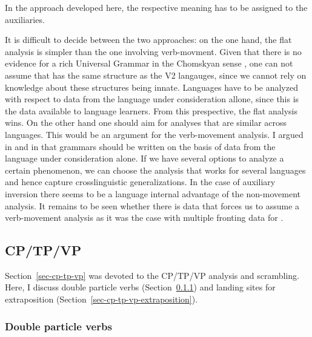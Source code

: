 \noindent
In the approach developed here, the respective meaning has to be assigned to the auxiliaries.

It is difficult to decide between the two approaches: on the one hand, the flat analysis is simpler
than the one involving verb-movment. Given that there is no evidence for a rich Universal Grammar in
the Chomskyan sense \citep{HCF2002a}, one can not assume that  has the same structure as the
 V2 langauges, since we cannot rely on knowledge about these structures being
innate. Languages have to be analyzed with respect to data from the language under consideration
allone, since this is the data available to language learners. From this prespective, the flat
analysis wins. On the other hand one should aim for analyses that are similar across languages. This
would be an argument for the verb-movement analysis. I argued in  and in
 that grammars should be written on the basis of data from the language under
consideration alone. If we have several options to analyze a certain phenomenon, we can choose the
analysis that works for several languages and hence capture crosslinguistic generalizations. In the
case of  auxiliary inversion there seems to be a language internal advantage of the
non-movement analysis. It remains to be seen whether there is data that forces us to assume a verb-movement
analysis as it was the case with multiple fronting data for  \citep{Mueller2005d,MuellerGS}.





\subsection{CP/TP/VP}
\label{sec-cp-tp-vp-and-verb-last-non-movement}

Section~\ref{sec-cp-tp-vp} was devoted to the CP/TP/VP analysis and
scrambling. Here, I discuss double particle verbs (Section~\ref{sec-cp-tp-vp-double-particles}) and landing sites for extraposition (Section~\ref{sec-cp-tp-vp-extraposition}).

\subsubsection{Double particle verbs}
\label{sec-cp-tp-vp-double-particles}



